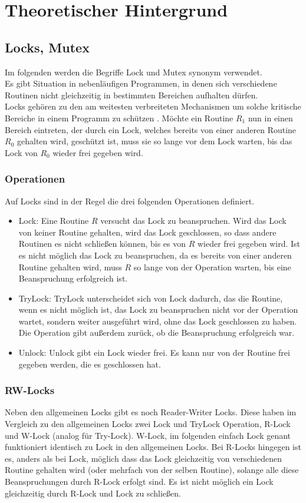 \chapter{Theoretischer Hintergrund}

\section{Locks, Mutex}
Im folgenden werden die Begriffe Lock und Mutex synonym verwendet.\\
Es gibt Situation in nebenläufigen Programmen, in denen sich verschiedene 
Routinen nicht gleichzeitig in bestimmten Bereichen aufhalten dürfen.\\
Locks gehören zu den am weitesten verbreiteten Mechanismen um solche kritische 
Bereiche in einem Programm zu schützen \cite{zhou}.
Möchte ein Routine $R_1$ nun in einen Bereich 
eintreten, der durch ein Lock, welches bereits von einer anderen Routine $R_0$ 
gehalten wird, geschützt ist, muss sie so lange vor dem Lock warten, bis das Lock 
von $R_0$ wieder frei gegeben wird.
\subsection{Operationen}
Auf Locks sind in der Regel die drei folgenden Operationen definiert.
\begin{itemize}
    \item Lock: Eine Routine $R$ versucht das Lock zu beanspruchen. Wird das Lock 
        von keiner Routine gehalten, wird das Lock geschlossen, so dass andere 
        Routinen es nicht schließen können, bis es von $R$ wieder frei gegeben 
        wird. Ist es nicht möglich das Lock zu beanspruchen, da es bereits von 
        einer anderen Routine gehalten wird, muss $R$ so lange von der Operation 
        warten, bis eine Beanspruchung erfolgreich ist.
    \item TryLock: TryLock unterscheidet sich von Lock dadurch, das die Routine,
        wenn es nicht möglich ist, das Lock zu beanspruchen nicht vor der 
        Operation wartet, sondern weiter ausgeführt wird, ohne das Lock geschlossen
        zu haben. Die Operation gibt außerdem zurück, ob die Beanspruchung 
        erfolgreich war.
    \item Unlock: Unlock gibt ein Lock wieder frei. Es kann nur von der Routine 
        frei gegeben werden, die es geschlossen hat.
\end{itemize}
\subsection{RW-Locks}
Neben den allgemeinen Locks gibt es noch Reader-Writer Locks. Diese haben im 
Vergleich zu den allgemeinen Locks zwei Lock und TryLock Operation, R-Lock und 
W-Lock (analog für Try-Lock). W-Lock, im folgenden einfach Lock genant funktioniert 
identisch zu Lock in den allgemeinen Locks. Bei R-Locks hingegen ist es, anders 
als bei Lock, möglich dass das Lock gleichzeitig von verschiedenen Routine gehalten wird
(oder mehrfach von der selben Routine), solange alle diese Beanspruchungen durch 
R-Lock erfolgt sind. Es ist nicht möglich ein Lock gleichzeitig durch R-Lock und 
Lock zu schließen.

